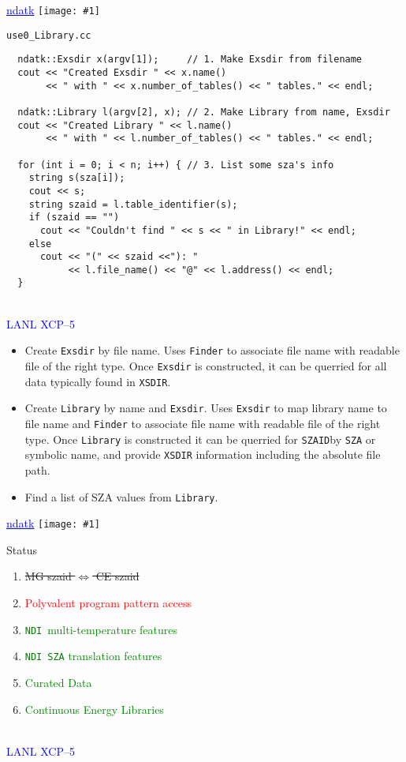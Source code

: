 \documentclass[clock]{slides}
\newenvironment{xslide}[1][logo.jpg]{\begin{slide} \tiny
\textcolor{blue}{\underline{ndatk}} \hfill
\texttt{[image: \#1]}
\normalsize}{\vfill\tiny
\textcolor{blue}{\hrulefill \\LANL XCP--5}
\end{slide}}
\newcommand{\NDI}{\texttt{NDI}}
\newcommand{\zaid}{\texttt{SZAID}}
\begin{document}
\begin{xslide}
\begin{center}\Large
\texttt{use0\_Library.cc}
\end{center}
\tiny
\begin{verbatim}
  ndatk::Exsdir x(argv[1]);     // 1. Make Exsdir from filename
  cout << "Created Exsdir " << x.name()
       << " with " << x.number_of_tables() << " tables." << endl;

  ndatk::Library l(argv[2], x); // 2. Make Library from name, Exsdir
  cout << "Created Library " << l.name()
       << " with " << l.number_of_tables() << " tables." << endl;

  for (int i = 0; i < n; i++) { // 3. List some sza's info
    string s(sza[i]);
    cout << s;
    string szaid = l.table_identifier(s);
    if (szaid == "") 
      cout << "Couldn't find " << s << " in Library!" << endl;
    else
      cout << "(" << szaid <<"): " 
           << l.file_name() << "@" << l.address() << endl;
  }
\end{verbatim}
\end{xslide}

\begin{note}\small
\begin{itemize}
\item Create \texttt{Exsdir} by file name.  Uses \texttt{Finder} to
  associate file name with readable file of the right type.  Once
  \texttt{Exsdir} is constructed, it can be querried for all data typically
  found in \texttt{XSDIR}.
\item Create \texttt{Library} by name and \texttt{Exsdir}.  Uses
  \texttt{Exsdir} to map library name to file name and \texttt{Finder}
  to associate file name with readable file of the right type.  Once
  \texttt{Library} is constructed it can be querried for \zaid by
  \texttt{SZA} or symbolic name, and provide \texttt{XSDIR}
  information including the absolute file path.
\item Find a list of SZA values from \texttt{Library}.
\end{itemize}

\end{note}

\begin{xslide}
\begin{center}\Large
Status
\end{center}
\begin{enumerate}
\item \sout{MG szaid $\Leftrightarrow$ CE szaid}
\item \textcolor{red}{Polyvalent program pattern access}
\item \textcolor{green}{\NDI\ multi-temperature features}
\item \textcolor{green}{\NDI\ \texttt{SZA} translation features}
\item \textcolor{green}{Curated Data}
\item \textcolor{green}{Continuous Energy Libraries}
\end{enumerate}

\end{xslide}
\end{document}
